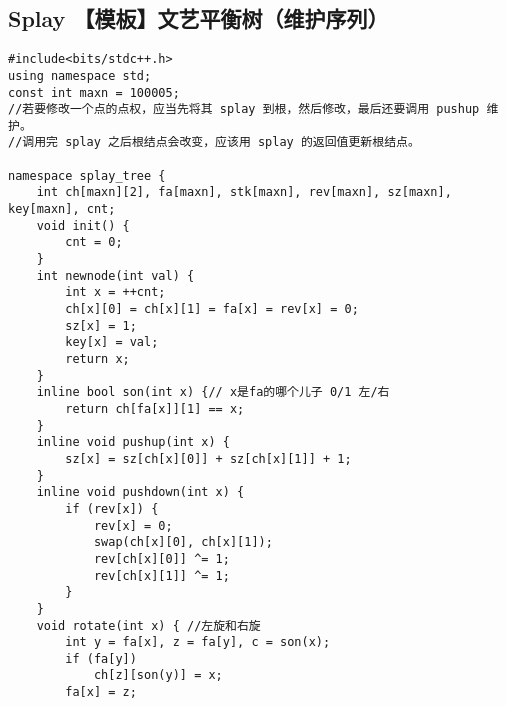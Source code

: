 \subsection{Splay 【模板】文艺平衡树（维护序列）}
\begin{verbatim}
#include<bits/stdc++.h>
using namespace std;
const int maxn = 100005;
//若要修改一个点的点权，应当先将其 splay 到根，然后修改，最后还要调用 pushup 维护。
//调用完 splay 之后根结点会改变，应该用 splay 的返回值更新根结点。

namespace splay_tree {
    int ch[maxn][2], fa[maxn], stk[maxn], rev[maxn], sz[maxn], key[maxn], cnt;
    void init() {
        cnt = 0;
    }
    int newnode(int val) {
        int x = ++cnt;
        ch[x][0] = ch[x][1] = fa[x] = rev[x] = 0;
        sz[x] = 1;
        key[x] = val;
        return x;
    }
    inline bool son(int x) {// x是fa的哪个儿子 0/1 左/右
        return ch[fa[x]][1] == x;
    }
    inline void pushup(int x) {
        sz[x] = sz[ch[x][0]] + sz[ch[x][1]] + 1;
    }
    inline void pushdown(int x) {
        if (rev[x]) {
            rev[x] = 0;
            swap(ch[x][0], ch[x][1]);
            rev[ch[x][0]] ^= 1;
            rev[ch[x][1]] ^= 1; 
        }
    }
    void rotate(int x) { //左旋和右旋
        int y = fa[x], z = fa[y], c = son(x);
        if (fa[y])
            ch[z][son(y)] = x;
        fa[x] = z;
        

\end{verbatim}
